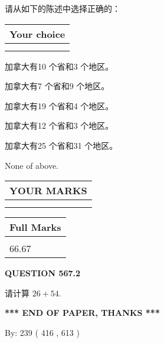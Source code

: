 \documentclass{ctexart}
\begin{document}
  
请从如下的陈述中选择正确的：
  
  
\noindent\hspace{3.0in} \begin{tabular}{|l|}
\hline
Your choice \\
\hline
 \\ 
 \\ 
\hline
\end{tabular}
  
  
 
 
加拿大有10 个省和3 个地区。
 
 
加拿大有7 个省和9 个地区。
 
 
加拿大有19 个省和4 个地区。
 
 
加拿大有12 个省和3 个地区。
 
 
加拿大有25 个省和31 个地区。
 
 
 None of above.
 
 
  
\vspace{0.2in}
  
\noindent\begin{tabular}{|l|}
\hline
 YOUR MARKS  \\
\hline
 \\ 
 \\ 
\hline
\end{tabular}
\hspace{0.05in} \begin{tabular}{|l|}
\hline
 Full Marks  \\
\hline
 \\ 
66.67 \\
\hline
\end{tabular}
{\textbf{\Large{QUESTION
567.2 
}}}
  
  
 
请计算 $ %
26 +  %
54 $.
 

 

 
   
   
 \vspace{0.2in}
 
   
   
   
   
\vspace{1.0in} 
{\textbf{\large{ *** END OF PAPER, THANKS *** }}} 
   
   
\hspace{1.0in} By: 
 239 ( 416 ,  613 )
   
\end{document}
